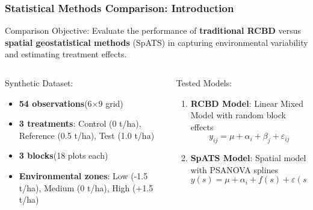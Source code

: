 \documentclass[aspectratio=43]{beamer}
\begin{document}
\begin{frame}
    \frametitle{Statistical Methods Comparison: Introduction}
    
    \begin{block}{Comparison Objective:}
        Evaluate the performance of \textbf{traditional RCBD} versus \textbf{spatial geostatistical methods} (SpATS) in capturing environmental variability and estimating treatment effects.
    \end{block}
    
    \begin{columns}
        \begin{column}{0.5\textwidth}
            \begin{exampleblock}{Synthetic Dataset:}
                \begin{itemize}
                    \item \textbf{\small 54 observations}\small (6\ensuremath{\times}9 grid)
                    \item \textbf{\small 3 treatments}\small : Control (0 t/ha), Reference (0.5 t/ha), Test (1.0 t/ha)
                    \item \textbf{\small 3 blocks}\small (18 plots each)
                    \item \textbf{\small Environmental zones}\small : Low (-1.5 t/ha), Medium (0 t/ha), High (+1.5 t/ha)
                \end{itemize}
            \end{exampleblock}
        \end{column}
        
        \begin{column}{0.5\textwidth}
            \begin{alertblock}{Tested Models:}
                \begin{enumerate}
                    \item \textbf{RCBD Model}: Linear Mixed Model with random block effects
                    \begin{equation*}
                        y_{ij} = \mu + \alpha_i + \beta_j + \varepsilon_{ij}
                    \end{equation*}
                    
                    \item \textbf{SpATS Model}: Spatial model with PSANOVA splines
                    \begin{equation*}
                        y(s) = \mu + \alpha_i + f(s) + \varepsilon(s)
                    \end{equation*}
                \end{enumerate}
            \end{alertblock}
        \end{column}
    \end{columns}
    

\end{frame}
\end{document}
